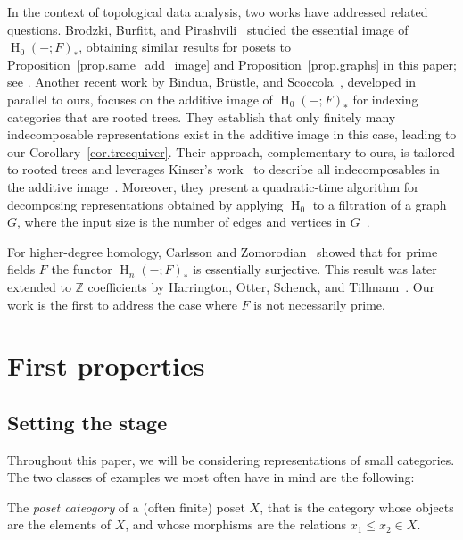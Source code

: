 \documentclass[a4paper]{amsart}
\theoremstyle{plain}
\theoremstyle{definition}
\theoremstyle{remark}
\newcommand{\Z}{\mathbb{Z}}
\begin{document}
In the context of topological data analysis, two works have addressed related questions. Brodzki, Burfitt, and Pirashvili~\cite{brodzki2020complexity} studied the essential image of $\operatorname{H}_0(-;F)_*$, obtaining similar results for posets to Proposition~\ref{prop.same_add_image} and Proposition~\ref{prop.graphs} in this paper; see \cite[Theorem 4.4, Theorem 5.9]{brodzki2020complexity}. Another recent work by Bindua, Brüstle, and Scoccola~\cite{bindua2024decomposing}, developed in parallel to ours, focuses on the additive image of $\operatorname{H}_0(-;F)_*$ for indexing categories that are rooted trees. They establish that only finitely many indecomposable representations exist in the additive image in this case, leading to our Corollary~\ref{cor.treequiver}. Their approach, complementary to ours, is tailored to rooted trees and leverages Kinser's work~\cite{kinser2010rank} to describe all indecomposables in the additive image~\cite[Corollary C]{bindua2024decomposing}. Moreover, they present a quadratic-time algorithm for decomposing representations obtained by applying $\operatorname{H}_0$ to a filtration of a graph $G$, where the input size is the number of edges and vertices in $G$~\cite[Theorem D]{bindua2024decomposing}.

For higher-degree homology, Carlsson and Zomorodian~\cite{carlsson2007theory} showed that for prime fields $F$ the functor $\operatorname{H}_n(-;F)_*$ is essentially surjective. This result was later extended to $\Z$ coefficients by Harrington, Otter, Schenck, and Tillmann~\cite{harrington2019stratifying}. Our work is the first to address the case where $F$ is not necessarily prime.
 

\section{First properties}
\label{sec.basic}

\subsection{Setting the stage}

Throughout this paper, we will be considering representations of small categories. The two classes of examples we most often have in mind are the following:

The \emph{poset cateogory} of a (often finite) poset \( X \), that is the category whose objects are the elements of \( X \), and whose morphisms are the relations \( x_1 \leq x_2 \in X \).
\end{document}
